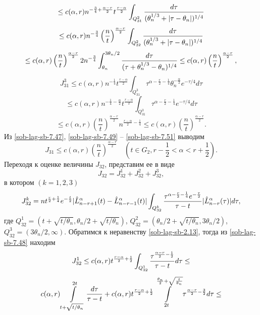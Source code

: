 $$
\le c(\alpha,r)n^{-\frac34+\frac{\alpha-r}{2}}t^\frac{r-\alpha}{2}\int_{Q_{31}^2}{d\tau\over(\theta_n^{1/3}+|\tau-\theta_n|)^{1/4}}
$$
$$
\le c(\alpha,r)n^{-\frac34}\left(\frac{n}{t}\right)^{\frac{\alpha-r}{2}}
\int_{Q_{32}^2}{d\tau\over(\theta_n^{1/3}+|\tau-\theta_n|)^{1/4}}
$$
\begin{equation}\label{sob-lag-sb-7.50}
\le c(\alpha,r)\left(\frac{n}{t}\right)^{\frac{\alpha-r}{2}}
2n^{-\frac34}\int_{\theta_n}^{3\theta_n/2}{d\tau\over(\tau+ \theta_n^{1/3}-\theta_n)^{1/4}}
\le c(\alpha,r)\left(\frac{n}{t}\right)^{\frac{\alpha-r}{2}},
\end{equation}
$$
J_{31}^3\le c(\alpha,r)n^{-\frac14}t^\frac{r-\alpha}{2}\int_{Q_{31}^3}\tau^{\alpha-\frac{r}{2}-\frac14}\theta_n^{-\frac{\alpha}{2}}e^{-\tau/4}d\tau
$$
$$
\le c(\alpha,r)n^{-\frac14-\frac{\alpha}{2}}t^\frac{r-\alpha}{2}\int_{Q_{31}^3}\tau^{\alpha-\frac{r}{2}-\frac14}e^{-\tau/4}d\tau
$$
\begin{equation}\label{sob-lag-sb-7.51}
\le c(\alpha,r)\left(\frac{n}{t}\right)^{\frac{\alpha-r}{2}}n^{\frac{r-\alpha}{2}-\frac14}\le c(\alpha,r)\left(\frac{n}{t}\right)^{\frac{\alpha-r}{2}}.
\end{equation}
Из \eqref{sob-lag-sb-7.47},  \eqref{sob-lag-sb-7.49} -- \eqref{sob-lag-sb-7.51} выводим
\begin{equation}\label{sob-lag-sb-7.52}
J_{31}\le c(\alpha,r)\left(\frac{n}{t}\right)^{\frac{\alpha-r}{2}}\quad (t\in G_2, r-\frac12<\alpha<r+\frac12).
\end{equation}
Переходя к оценке величины $J_{32}$, представим ее в виде
\begin{equation}\label{sob-lag-sb-7.53}
J_{32}=J_{32}^1+J_{32}^2+J_{32}^3,
\end{equation}
в котором $(k=1,2,3)$
\begin{equation}\label{sob-lag-sb-7.54}
J_{32}^k=nt^{\frac{r}{2}+\frac14}e^{-\frac{t}{2}}|\hat L_{n-r+1}^\alpha(t)-\hat L_{n-r-1}^\alpha(t)|\int_{Q_{32}^k}{\tau^{\alpha-\frac{r}{2}-\frac14}e^{-\frac{\tau}{2}}\over \tau-t}|\hat L_{n-r}^\alpha(\tau)|d\tau,
\end{equation}
где $Q_{32}^1=(t+\sqrt{t/\theta_n},\theta_n/2+\sqrt{t/\theta_n})$, $Q_{32}^2=(\theta_n/2+\sqrt{t/\theta_n},3\theta_n/2)$, $Q_{32}^3=(3\theta_n/2,\infty)$. Обратимся  к неравенству \eqref{sob-lag-sb-2.13}, тогда из  \eqref{sob-lag-sb-7.48} находим
$$
J_{32}^1\le c(\alpha,r)t^{\frac{r-\alpha}{2}+\frac12}\int_{Q_{32}^1}{\tau^{\frac{\alpha-r}{2}-\frac12}\over \tau-t}d\tau\le
$$
$$
c(\alpha,r)\int\limits_{t+\sqrt{t/\theta_n}}^{2t}{d\tau\over \tau-t}+c(\alpha,r)t^{\frac{r-\alpha}{2}+\frac12}\int\limits_{2t}^{\frac{\theta_n}{2}+\sqrt{\frac{t}{\theta_n}}}\tau^{\frac{\alpha-r}{2}-\frac32}d\tau\le
$$

